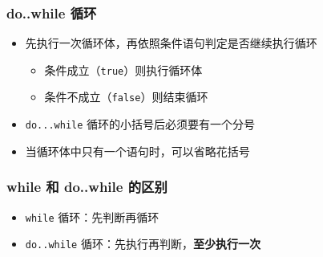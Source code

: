 \begin{frame}[fragile]
    \frametitle{do..while 循环}

    \begin{overlayarea}{\textwidth}{.7\textheight}
        \begin{itemize}

                

            \item<1-> 先执行一次循环体，再依照条件语句判定是否继续执行循环

                \begin{itemize}
                    \item<2-> 条件成立（\lstinline|true|）则执行循环体
                    \item<2-> 条件不成立（\lstinline|false|）则结束循环
                \end{itemize}

            \item<3-> \lstinline|do...while| 循环的小括号后必须要有一个分号

            \item<4-> 当循环体中只有一个语句时，可以省略花括号
        \end{itemize}
    \end{overlayarea}
\end{frame}

\begin{frame}[fragile]
    \frametitle{while 和 do..while 的区别}

    \begin{itemize}
        \item \lstinline|while| 循环：先判断再循环
        \item \lstinline|do..while| 循环：先执行再判断，\textbf{至少执行一次}
    \end{itemize}

\end{frame}

